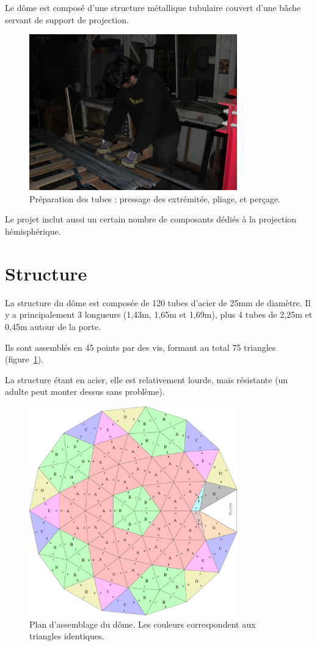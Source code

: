 \documentclass[a4paper,12pt]{report}
\begin{document}
Le dôme est composé d'une structure métallique tubulaire couvert d'une bâche
servant de support de projection.

\begin{figure}[!h]
\centering
\includegraphics[width=9cm]{pliage_tubes.jpg}
\caption{Préparation des tubes : pressage des extrémitée, pliage, et perçage.}
\end{figure}

Le projet inclut aussi un certain nombre de composants dédiés à la projection hémisphérique.

\section{Structure}

La structure du dôme est composée de 120 tubes d'acier de 25mm de diamètre.  Il
y a principalement 3 longueurs (1,43m, 1,65m et 1,69m), plus 4 tubes de 2,25m
et 0,45m autour de la porte.

Ils sont assemblés en 45 points par des vis, formant au total 75 triangles
(figure~\ref{plan_assemblage}).

La structure étant en acier, elle est relativement lourde, mais résistante (un
adulte peut monter dessus sans problème).

\begin{figure}
	\centering 
	\includegraphics[width=9cm]{plan_assemblage.pdf}
	\caption{Plan d'assemblage du dôme. Les couleurs correspondent aux triangles
	identiques.} 
	\label{plan_assemblage} 
\end{figure}
\end{document}
